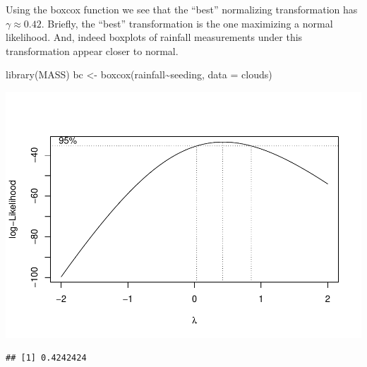 \documentclass[
]{book}
\newenvironment{Shaded}{\begin{snugshade}}{\end{snugshade}}
\newcommand{\AttributeTok}[1]{\textcolor[rgb]{0.77,0.63,0.00}{#1}}
\newcommand{\DecValTok}[1]{\textcolor[rgb]{0.00,0.00,0.81}{#1}}
\newcommand{\FloatTok}[1]{\textcolor[rgb]{0.00,0.00,0.81}{#1}}
\newcommand{\FunctionTok}[1]{\textcolor[rgb]{0.00,0.00,0.00}{#1}}
\newcommand{\NormalTok}[1]{#1}
\newcommand{\OtherTok}[1]{\textcolor[rgb]{0.56,0.35,0.01}{#1}}
\newcommand{\SpecialCharTok}[1]{\textcolor[rgb]{0.00,0.00,0.00}{#1}}
\begin{document}
Using the boxcox function we see that the ``best'' normalizing transformation has \(\gamma \approx 0.42\). Briefly, the ``best'' transformation is the one maximizing a normal likelihood. And, indeed boxplots of rainfall measurements under this transformation appear closer to normal.

\begin{Shaded}
\begin{Highlighting}[]
\FunctionTok{library}\NormalTok{(MASS)}
\NormalTok{bc }\OtherTok{\textless{}{-}} \FunctionTok{boxcox}\NormalTok{(rainfall}\SpecialCharTok{\textasciitilde{}}\NormalTok{seeding, }\AttributeTok{data =}\NormalTok{ clouds)}
\end{Highlighting}
\end{Shaded}

\includegraphics{04-Non-Normal-Responses_files/figure-latex/unnamed-chunk-3-1.pdf}

\begin{Shaded}
\end{Shaded}

\begin{verbatim}
## [1] 0.4242424
\end{verbatim}

\begin{Shaded}
\end{Shaded}
\end{document}
